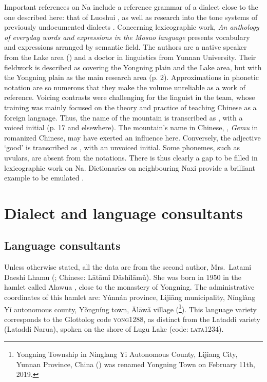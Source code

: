 Important references on Na include a reference grammar of a dialect close to the one described here: that of Luoshui  \parencite{lidz2010}, as well as research into the tone systems of previously undocumented dialects \parencite{a2016,dobbsetal2016,fily_documentation_2022}. Concerning lexicographic work, \emph{An anthology of everyday words and expressions in the Mosuo language} \parencite{zhibaetal2013} presents vocabulary and expressions arranged by semantic field. The authors are a native speaker from the Lake area () and a doctor in linguistics from Yunnan University. Their fieldwork is described as covering the Yongning plain and the Lake area, but with the Yongning plain as the main research area (p. 2). Approximations in phonetic notation are so numerous that they make the volume unreliable as a work of reference. Voicing contrasts were challenging for the linguist in the team, whose training was mainly focused on the theory and practice of teaching Chinese as a foreign language. Thus, the name of the mountain  is transcribed as , with a voiced initial (p. 17 and elsewhere). The mountain’s name in Chinese, , \emph{Gemu} in romanized Chinese, may have exerted an influence here. Conversely, the adjective  ‘good’ is transcribed as , with an unvoiced initial. Some phonemes, such as uvulars, are absent from the notations. There is thus clearly a gap to be filled in lexicographic work on Na. Dictionaries on neighbouring Naxi provide a brilliant example to be emulated \parencite{heetal2011,pinsonetal2012}.

\section{Dialect and language consultants}
\label{sec:dialect}

\subsection{Language consultants}
Unless otherwise stated, all the data are from the second author, Mrs.\ Latami Daeshi Lhamu (; Chinese:  Lātāmǐ Dǎshǐlāmǔ). She was born in 1950 in the hamlet called Alawua , close to the monastery of Yongning. The administrative coordinates of this hamlet are: Yúnnán province, Lìjiāng municipality, Nínglàng Yí autonomous county, Yǒngníng town, Ālāwǎ village (\footnote{Yongning Township in Ninglang Yi Autonomous County, Lijiang City, Yunnan Province, China () was renamed Yongning Town  on February 11th, 2019.}). This language variety corresponds to the Glottolog code \textsc{yong1288}, as distinct from the Lataddi variety (Lataddi Narua), spoken on the shore of Lugu Lake (code: \textsc{lata1234}).

